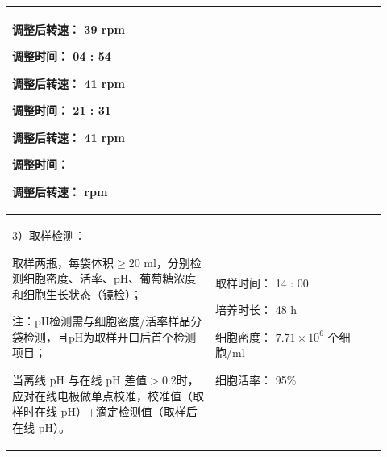 \documentclass[UTF8,10pt,a4paper,fontset=fandol]{ctexart}
\newcommand{\fieldvalue}[1]{#1}
\newcommand{\handwritten}[1]{#1}
\begin{document}
\begin{tabular}{|p{0.50\linewidth}|p{0.42\linewidth}|}
\begin{minipage}[t]{\linewidth}
调整后转速：
\fieldvalue{\handwritten{39}} rpm

调整时间：
\fieldvalue{\handwritten{04 : 54}}

调整后转速：
\fieldvalue{\handwritten{41}} rpm

调整时间：
\fieldvalue{\handwritten{21 : 31}}

调整后转速：
\fieldvalue{\handwritten{41}} rpm

调整时间：\underline{\hspace{1.5cm}}

调整后转速：\underline{\hspace{1.2cm}} rpm
\vspace{2pt}
\end{minipage}
\\
\hline
\begin{minipage}[t]{\linewidth}
\vspace{2pt}
3）取样检测：

取样两瓶，每袋体积$\geq20$ ml，分别检测细胞密度、活率、pH、葡萄糖浓度和细胞生长状态（镜检）；

注：pH检测需与细胞密度/活率样品分袋检测，且pH为取样开口后首个检测项目；

当离线 pH 与在线 pH 差值$>0.2$时，应对在线电极做单点校准，校准值（取样时在线 pH）+滴定检测值（取样后在线 pH）。
\vspace{4pt}
\end{minipage}
&
\begin{minipage}[t]{\linewidth}
\vspace{2pt}
取样时间：
\fieldvalue{\handwritten{14 : 00}}

培养时长：
\fieldvalue{\handwritten{48}} h

细胞密度：
\fieldvalue{\handwritten{$7.71\times10^{6}$}} 个细胞/ml

细胞活率：
\fieldvalue{\handwritten{95}}\%


\end{minipage}
\end{tabular}
\end{document}
